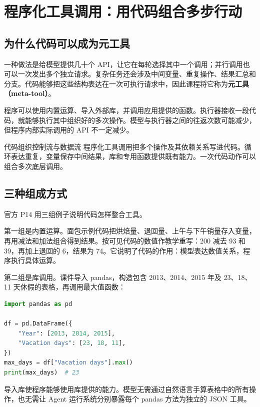 \documentclass[11pt,a4paper]{article}
\begin{document}
\clearpage
\section{程序化工具调用：用代码组合多步行动}
\subsection{为什么代码可以成为元工具}
一种做法是给模型提供几十个 API，让它在每轮选择其中一个调用；并行调用也可以一次发出多个独立请求。复杂任务还会涉及中间变量、重复操作、结果汇总和分支。代码能够把这些结构表达在一次可执行请求中，因此课程将它称为\textbf{元工具（meta-tool）}。

程序可以使用内置运算、导入外部库，并调用应用提供的函数。执行器接收一段代码，就能够执行其中组织好的多次操作。模型与执行器之间的往返次数可能减少，但程序内部实际调用的 API 不一定减少。

\begin{importantbox}{代码组织控制流与数据流}
程序化工具调用把多个操作及其依赖关系写进代码。循环表达重复，变量保存中间结果，库和专用函数提供既有能力。一次代码动作可以组合多次底层调用。
\end{importantbox}

\subsection{三种组成方式}
官方 P14 用三组例子说明代码怎样整合工具。

第一组是内置运算。面包示例代码把烘焙量、退回量、上午与下午销量存入变量，再用减法和加法组合得到结果。按可见代码的数值作教学重写：200 减去 93 和 39，再加上退回的 6，结果为 74。它说明了代码的作用：模型表达数值关系，程序执行具体运算。

第二组是库调用。课件导入 pandas，构造包含 2013、2014、2015 年及 23、18、11 天休假的表格，再调用最大值函数：

\noindent\begin{minipage}{\textwidth}
\begin{lstlisting}[language=Python,caption={根据课程 P14 重排的代码：用 pandas 取得休假天数最大值}]
import pandas as pd

df = pd.DataFrame({
    "Year": [2013, 2014, 2015],
    "Vacation days": [23, 18, 11],
})
max_days = df["Vacation days"].max()
print(max_days)  # 23
\end{lstlisting}
\end{minipage}

导入库使程序能够使用库提供的能力。模型无需通过自然语言手算表格中的所有操作，也无需让 Agent 运行系统分别暴露每个 pandas 方法为独立的 JSON 工具。
\end{document}
